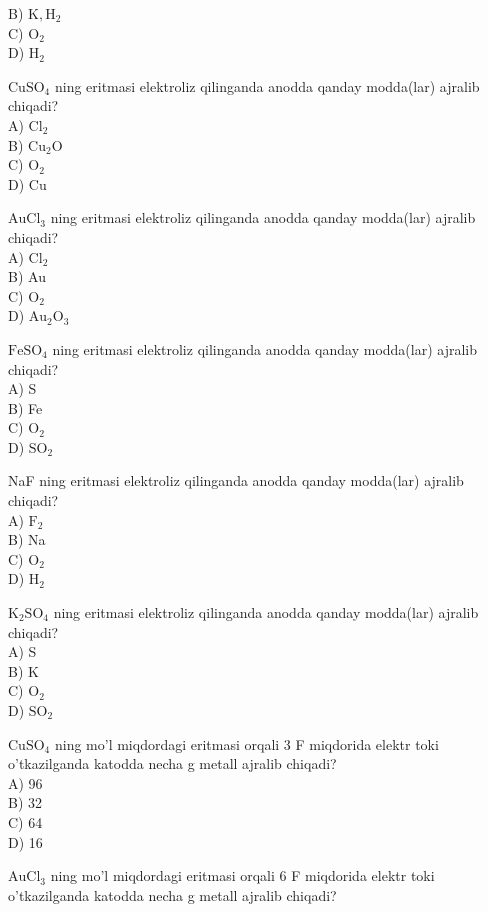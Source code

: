 B) $\mathrm{K}, \mathrm{H}_{2}$\\
C) $\mathrm{O}_{2}$\\
D) $\mathrm{H}_{2}$
  \item $\mathrm{CuSO}_{4}$ ning eritmasi elektroliz qilinganda anodda qanday modda(lar) ajralib chiqadi?\\
A) $\mathrm{Cl}_{2}$\\
B) $\mathrm{Cu}_{2} \mathrm{O}$\\
C) $\mathrm{O}_{2}$\\
D) Cu
  \item $\mathrm{AuCl}_{3}$ ning eritmasi elektroliz qilinganda anodda qanday modda(lar) ajralib chiqadi?\\
A) $\mathrm{Cl}_{2}$\\
B) Au\\
C) $\mathrm{O}_{2}$\\
D) $\mathrm{Au}_{2} \mathrm{O}_{3}$
  \item $\mathrm{FeSO}_{4}$ ning eritmasi elektroliz qilinganda anodda qanday modda(lar) ajralib chiqadi?\\
A) S\\
B) Fe\\
C) $\mathrm{O}_{2}$\\
D) $\mathrm{SO}_{2}$
  \item NaF ning eritmasi elektroliz qilinganda anodda qanday modda(lar) ajralib chiqadi?\\
A) $\mathrm{F}_{2}$\\
B) Na\\
C) $\mathrm{O}_{2}$\\
D) $\mathrm{H}_{2}$
  \item $\mathrm{K}_{2} \mathrm{SO}_{4}$ ning eritmasi elektroliz qilinganda anodda qanday modda(lar) ajralib chiqadi?\\
A) S\\
B) K\\
C) $\mathrm{O}_{2}$\\
D) $\mathrm{SO}_{2}$
  \item $\mathrm{CuSO}_{4}$ ning mo'l miqdordagi eritmasi orqali 3 F miqdorida elektr toki o'tkazilganda katodda necha g metall ajralib chiqadi?\\
A) 96\\
B) 32\\
C) 64\\
D) 16\\
  \item $\mathrm{AuCl}_{3}$ ning mo'l miqdordagi eritmasi orqali 6 F miqdorida elektr toki o'tkazilganda katodda necha g metall ajralib chiqadi?\\
